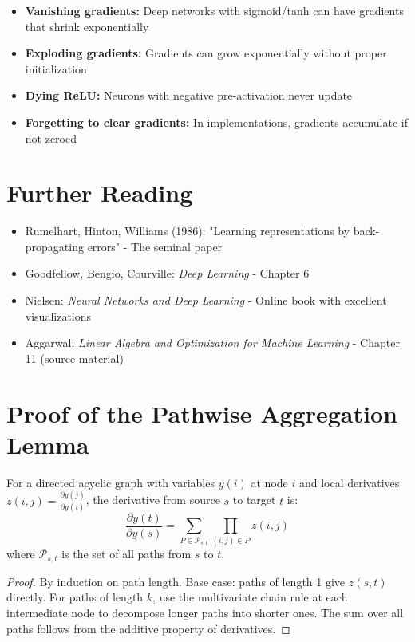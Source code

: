 \begin{notechapter}
\begin{itemize}
    \item \textbf{Vanishing gradients:} Deep networks with sigmoid/tanh can have gradients that shrink exponentially
    \item \textbf{Exploding gradients:} Gradients can grow exponentially without proper initialization
    \item \textbf{Dying ReLU:} Neurons with negative pre-activation never update
    \item \textbf{Forgetting to clear gradients:} In implementations, gradients accumulate if not zeroed
\end{itemize}

\section{Further Reading}

\begin{itemize}
    \item Rumelhart, Hinton, Williams (1986): "Learning representations by back-propagating errors" - The seminal paper
    \item Goodfellow, Bengio, Courville: \textit{Deep Learning} - Chapter 6
    \item Nielsen: \textit{Neural Networks and Deep Learning} - Online book with excellent visualizations
    \item Aggarwal: \textit{Linear Algebra and Optimization for Machine Learning} - Chapter 11 (source material)
\end{itemize}

\chapterappendix

\section{Proof of the Pathwise Aggregation Lemma}

\begin{lemma}
For a directed acyclic graph with variables $y(i)$ at node $i$ and local derivatives $z(i,j) = \frac{\partial y(j)}{\partial y(i)}$, the derivative from source $s$ to target $t$ is:
$$\frac{\partial y(t)}{\partial y(s)} = \sum_{P \in \mathcal{P}_{s,t}} \prod_{(i,j) \in P} z(i,j)$$
where $\mathcal{P}_{s,t}$ is the set of all paths from $s$ to $t$.
\end{lemma}

\begin{proof}
By induction on path length. Base case: paths of length 1 give $z(s,t)$ directly. For paths of length $k$, use the multivariate chain rule at each intermediate node to decompose longer paths into shorter ones. The sum over all paths follows from the additive property of derivatives.
\end{proof}


\end{notechapter}

